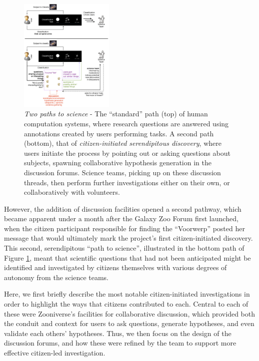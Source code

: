 \documentclass{sigchi}
\begin{document}
\begin{figure}[htbp]
\centering
\includegraphics[width=0.4\textwidth]{imgs/twopaths.png}
\caption{\emph{Two paths to science} - The ``standard'' path (top) of human computation systems, where research questions are answered using annotations created by users performing tasks.  A second path (bottom), that of \emph{citizen-initiated serendipitous discovery}, where users initiate the process by pointing out or asking questions about subjects, spawning collaborative hypothesis generation in the discussion forums. Science teams, picking up on these discussion threads, then perform further investigations either on their own, or collaboratively with volunteers.}
\label{fig:twopaths}
\end{figure}

However, the addition of discussion facilities opened a second pathway, which became apparent under a month after the Galaxy Zoo Forum first launched, when the citizen participant responsible for finding the ``Voorwerp'' posted her message that would ultimately mark the project's first citizen-initiated discovery.  This second, serendipitous ``path to science'', illustrated in the bottom path of Figure \ref{fig:twopaths}, meant that scientific questions that had not been anticipated might be identified and investigated by citizens themselves with various degrees of autonomy from the science teams.

Here, we first briefly describe the most notable citizen-initiated investigations in order to highlight the ways that citizens contributed to each.  Central to each of these were Zooniverse's facilities for collaborative discussion, which provided both the conduit and  context for users to ask questions, generate hypotheses, and even validate each others' hypotheses.  Thus, we then focus on the design of the discussion forums, and how these were refined by the team to support more effective citizen-led investigation. 
\end{document}
